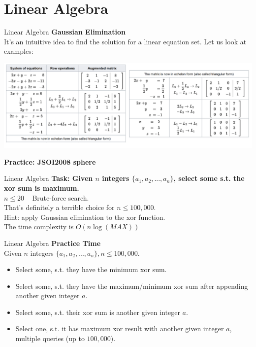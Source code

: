 \documentclass[mathserif,10pt]{beamer}
\begin{document}
\section{Linear Algebra}
\begin{frame}{Linear Algebra}
\textbf{\large Gaussian Elimination} \\[0.5cm]
It's an intuitive idea to find the solution for a linear equation set. Let us look at examples: \\
\begin{center}
\includegraphics[width=\linewidth]{Images/gauss} 
\end{center}
\pause
\textbf{Practice: JSOI2008 sphere}
\end{frame}


\begin{frame}{Linear Algebra}
\textbf{Task: Given $n$ integers $\{a_1, a_2, ..., a_n\}$, select some s.t. the xor sum is maximum.} \\[0.5cm]
\pause
$n \leq 20$ ~ Brute-force search. \pause
~\\ That's definitely a terrible choice for $n \leq 100,000$. \\[0.5cm]
Hint: apply Gaussian elimination to the xor function. \\
\pause 
The time complexity is $O(n\log(MAX))$
\end{frame}

\begin{frame}{Linear Algebra}
\textbf{Practice Time} \\[0.5cm]
Given $n$ integers $\{a_1, a_2, ..., a_n\}, n\leq 100,000$. \pause
\begin{itemize}
	\item Select some, s.t. they have the minimum xor sum. \pause
	\item Select some, s.t. they have the maximum/minimum xor sum after appending another given integer $a$. \pause
	\item Select some, s.t. their xor sum is another given integer $a$. \pause
	\item Select one, s.t. it has maximum xor result with another given integer $a$, multiple queries (up to $100,000$).
\end{itemize}
\end{frame}
\end{document}
